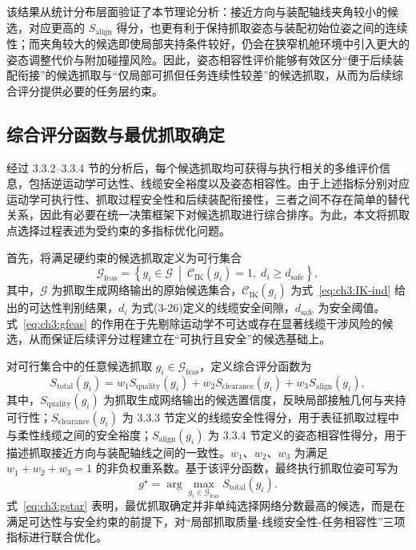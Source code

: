 该结果从统计分布层面验证了本节理论分析：接近方向与装配轴线夹角较小的候选，对应更高的 \(S_{\mathrm{align}}\) 得分，也更有利于保持抓取姿态与装配初始位姿之间的连续性；而夹角较大的候选即使局部夹持条件较好，仍会在狭窄机舱环境中引入更大的姿态调整代价与附加碰撞风险。因此，姿态相容性评价能够有效区分“便于后续装配衔接”的候选抓取与“仅局部可抓但任务连续性较差”的候选抓取，从而为后续综合评分提供必要的任务层约束。

\subsection{综合评分函数与最优抓取确定}

经过 3.3.2--3.3.4 节的分析后，每个候选抓取均可获得与执行相关的多维评价信息，包括逆运动学可达性、线缆安全裕度以及姿态相容性。由于上述指标分别对应运动学可执行性、抓取过程安全性和后续装配衔接性，三者之间不存在简单的替代关系，因此有必要在统一决策框架下对候选抓取进行综合排序。为此，本文将抓取点选择过程表述为受约束的多指标优化问题。

首先，将满足硬约束的候选抓取定义为可行集合
\begin{equation}
  \mathcal{G}_{\mathrm{feas}}=
  \left\{
  g_i\in\mathcal{G}\ \middle|\
  \mathcal{C}_{\mathrm{IK}}(g_i)=1,\;
  d_i\ge d_{\mathrm{safe}}
  \right\},
  \label{eq:ch3:gfeas}
\end{equation}
其中，$\mathcal{G}$ 为抓取生成网络输出的原始候选集合，$\mathcal{C}_{\mathrm{IK}}(g_i)$ 为式~\eqref{eq:ch3:IK-ind} 给出的可达性判别结果，$d_i$ 为式(3-26)定义的线缆安全间隙，$d_{\mathrm{safe}}$ 为安全阈值。式~\eqref{eq:ch3:gfeas} 的作用在于先剔除运动学不可达或存在显著线缆干涉风险的候选，从而保证后续评分过程建立在“可执行且安全”的候选基础上。

对可行集合中的任意候选抓取 $g_i\in\mathcal{G}_{\mathrm{feas}}$，定义综合评分函数为
\begin{equation}
  S_{\mathrm{total}}(g_i)=w_1S_{\mathrm{quality}}(g_i)+w_2S_{\mathrm{clearance}}(g_i)+w_3S_{\mathrm{align}}(g_i),
\end{equation}
其中，$S_{\mathrm{quality}}(g_i)$ 为抓取生成网络输出的候选置信度，反映局部接触几何与夹持可行性；$S_{\mathrm{clearance}}(g_i)$ 为 3.3.3 节定义的线缆安全性得分，用于表征抓取过程中与柔性线缆之间的安全裕度；$S_{\mathrm{align}}(g_i)$ 为 3.3.4 节定义的姿态相容性得分，用于描述抓取接近方向与装配轴线之间的一致性。$w_1$、$w_2$、$w_3$ 为满足 $w_1+w_2+w_3=1$ 的非负权重系数。基于该评分函数，最终执行抓取位姿可写为
\begin{equation}
  g^{\star}=\arg\max_{g_i\in\mathcal{G}_{\mathrm{feas}}}S_{\mathrm{total}}(g_i).
  \label{eq:ch3:gstar}
\end{equation}
式~\eqref{eq:ch3:gstar} 表明，最优抓取确定并非单纯选择网络分数最高的候选，而是在满足可达性与安全约束的前提下，对“局部抓取质量-线缆安全性-任务相容性”三项指标进行联合优化。

